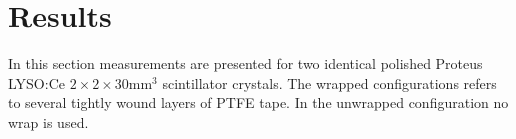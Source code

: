 \section{Results}
In this section measurements are presented for two identical polished Proteus LYSO:Ce $2\times2\times30$mm$^3$ scintillator crystals. The wrapped configurations refers to several tightly wound layers of PTFE tape. In the unwrapped configuration no wrap is used.